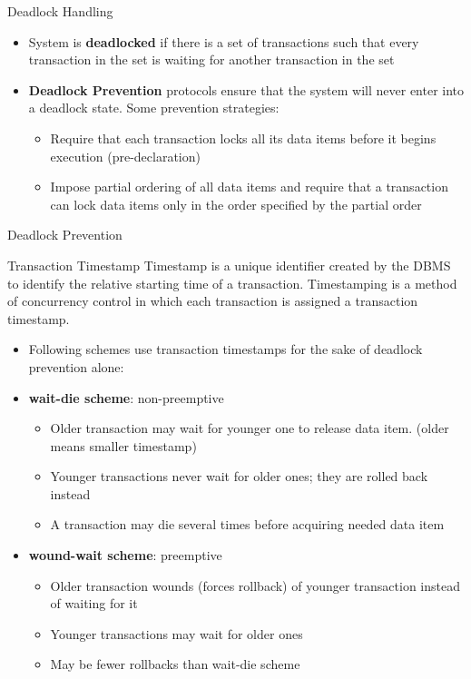 \documentclass[aspectratio=169, xcolor=dvipsnames]{beamer}
\begin{document}
\begin{frame}{Deadlock Handling}
    \begin{itemize}[<+->]
        \item System is \textbf{deadlocked} if there is a set of transactions such that every transaction in the set is waiting for another transaction in the set
        \item \textbf{Deadlock Prevention} protocols ensure that the system will never enter into a deadlock state. Some prevention strategies:
        \begin{itemize}
            \item[$\triangleright$] Require that each transaction locks all its data items before it begins execution (pre-declaration)
            \item[$\triangleright$] Impose partial ordering of all data items and require that a transaction can lock data items only in the order specified by the partial order
        \end{itemize}
    \end{itemize}
\end{frame}

\begin{frame}{Deadlock Prevention}
    \begin{block}{Transaction Timestamp}
        Timestamp is a unique identifier created by the DBMS to identify the relative starting time of a transaction. Timestamping is a method of concurrency control in which each transaction is assigned a transaction timestamp.
    \end{block}
    \begin{itemize}[<+->]
        \item Following schemes use transaction timestamps for the sake of deadlock prevention alone:
        \item \textbf{wait-die scheme}: non-preemptive
        \begin{itemize}
            \item[$\triangleright$] Older transaction may wait for younger one to release data item. (older means smaller timestamp)
            \item[$\triangleright$] Younger transactions never wait for older ones; they are rolled back instead
            \item[$\triangleright$] A transaction may die several times before acquiring needed data item
        \end{itemize}
        \item \textbf{wound-wait scheme}: preemptive
        \begin{itemize}
            \item[$\triangleright$] Older transaction wounds (forces rollback) of younger transaction instead of waiting for it
            \item[$\triangleright$] Younger transactions may wait for older ones
            \item[$\triangleright$] May be fewer rollbacks than wait-die scheme
        \end{itemize}
    \end{itemize}
\end{frame}
\end{document}
